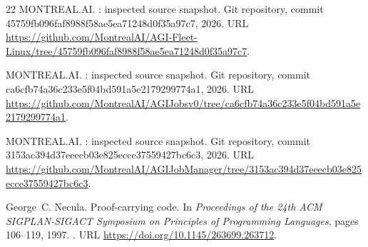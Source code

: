 \documentclass[11pt]{article}
\begin{document}
\begin{thebibliography}{22}
{MONTREAL.AI}.
: inspected source snapshot.
\newblock Git repository, commit 45759fb096faf8988f58ae5ea71248d0f35a97c7,
  2026{}.
\newblock URL
  \url{https://github.com/MontrealAI/AGI-Fleet-Linux/tree/45759fb096faf8988f58ae5ea71248d0f35a97c7}.

{MONTREAL.AI}.
: inspected source snapshot.
\newblock Git repository, commit ca6cfb74a36c233e5f04bd591a5e2179299774a1,
  2026{}.
\newblock URL
  \url{https://github.com/MontrealAI/AGIJobsv0/tree/ca6cfb74a36c233e5f04bd591a5e2179299774a1}.

{MONTREAL.AI}.
: inspected source snapshot.
\newblock Git repository, commit 3153ac394d37eeecb03e825ecce37559427bc6c3,
  2026{}.
\newblock URL
  \url{https://github.com/MontrealAI/AGIJobManager/tree/3153ac394d37eeecb03e825ecce37559427bc6c3}.

George~C. Necula.
\newblock Proof-carrying code.
\newblock In \emph{Proceedings of the 24th ACM SIGPLAN-SIGACT Symposium on
  Principles of Programming Languages}, pages 106--119, 1997.
\newblock {}.
\newblock URL \url{https://doi.org/10.1145/263699.263712}.

\end{thebibliography}
\end{document}
